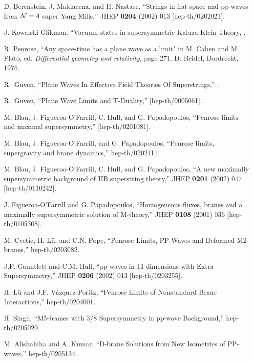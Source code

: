 \documentclass[a4paper,12pt]{article}
\begin{document}
\begin{thebibliography}{99}

 D. Berenstein, J. Maldacena, and H. Nastase, ``Strings in flat space and pp waves from ${\cal N}=4$ super Yang Mills,'' JHEP {\bf 0204} (2002) 013 [hep-th/0202021].

 J. Kowalski-Glikman, ``Vacuum states in supersymmetric Kaluza-Klein Theory, .

R. Penrose, ``Any space-time has a plane wave as a limit" in M. Cahen and M. Flato, ed. {\it Differential geometry and relativity}, page 271, D. Reidel, Dordrecht, 1976.

R.~G\"{u}ven,
``Plane Waves In Effective Field Theories Of Superstrings,'' .

 R.~G\"{u}ven, ``Plane Wave Limits and T-Duality,''  [hep-th/0005061].

 M. Blau, J. Figueroa-O'Farrill, C. Hull, and G. Papadopoulos, ``Penrose limits and maximal supersymmetry,''  [hep-th/0201081].

 M. Blau, J. Figueroa-O'Farrill, and G. Papadopoulos, ``Penrose limits, supergravity and brane dynamics,'' hep-th/0202111.

 M. Blau, J. Figueroa-O'Farrill, C. Hull, and G. Papadopoulos, ``A new maximally supersymmetric background of IIB superstring theory,'' JHEP {\bf 0201} (2002) 047 [hep-th/0110242].

 J. Figueroa-O'Farrill and G. Papadopoulos, ``Homogeneous fluxes, branes and a maximally supersymmetric solution of M-theory,'' JHEP {\bf 0108} (2001) 036 [hep-th/0105308].

 M. Cvetic, H. L\"{u}, and C.N. Pope, ``Penrose Limits, PP-Waves and Deformed M2-branes,'' hep-th/0203082.

  J.P. Gauntlett and C.M. Hull, ``pp-waves in 11-dimensions with Extra Supersymmetry,'' JHEP {\bf 0206} (2002) 013 [hep-th/0203255].

 H. L\"{u} and J.F. V\'{a}zquez-Poritz, ``Penrose Limits of Nonstandard Brane Interactions,'' hep-th/0204001.

 H. Singh, ``M5-branes with 3/8 Supersymmetry in pp-wave Background,'' hep-th/0205020.

 M. Alishahiha and A. Kumar, ``D-brane Solutions from New Isometries of PP-waves,'' hep-th/0205134.


\end{thebibliography}
\end{document}
